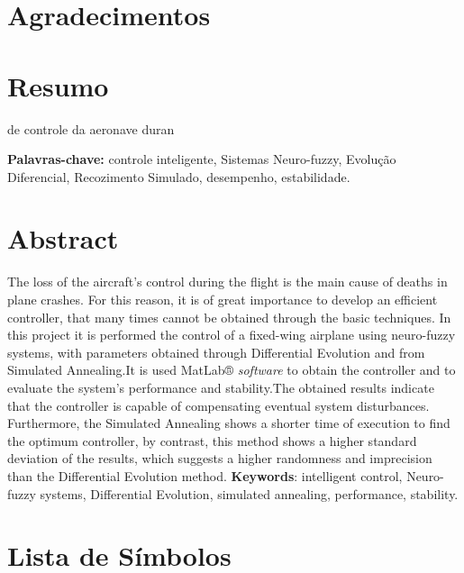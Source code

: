 \documentclass[10pt,a4paper]{article}
\numberwithin{equation}{section}
\begin{document}
 
\section*{Agradecimentos}

\par 

\newpage

\section*{Resumo}
\par  de controle da aeronave duran


\newline
\newline
\newline
\textbf{Palavras-chave:} controle inteligente, Sistemas Neuro-fuzzy, Evolução Diferencial, Recozimento Simulado, desempenho, estabilidade.

\newpage
\section*{Abstract}
\par The loss of the aircraft’s control during the flight is the main cause of deaths in plane crashes. For this reason, it is of great importance to develop an efficient controller, that many times cannot be obtained through the basic techniques. In this project it is performed the control of a fixed-wing airplane using neuro-fuzzy systems, with parameters obtained through Differential Evolution and from Simulated Annealing.It is used MatLab® \textit{software} to obtain the controller and to evaluate the system’s performance and stability.The obtained results indicate that the controller is capable of compensating eventual system disturbances. Furthermore, the Simulated Annealing shows a shorter time of execution to find the optimum controller, by contrast, this method shows a higher standard deviation of the results, which suggests a higher randomness and imprecision than the Differential Evolution method.
\newline
\newline
\newline
\textbf{Keywords}: intelligent control, Neuro-fuzzy systems, Differential Evolution, simulated annealing, performance, stability.
\newpage
\listoffigures
\newpage
\listoftables
\newpage
\section*{Lista de Símbolos}
\end{document}
